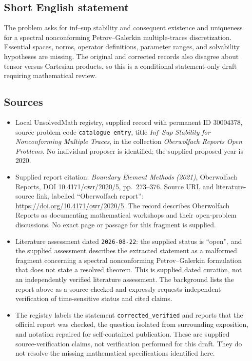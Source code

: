 \documentclass[11pt]{article}
\begin{document}
\subsection{Short English statement}
The problem asks for inf--sup stability and consequent existence and uniqueness for a spectral nonconforming Petrov--Galerkin multiple-traces discretization. Essential spaces, norms, operator definitions, parameter ranges, and solvability hypotheses are missing. The original and corrected records also disagree about tensor versus Cartesian products, so this is a conditional statement-only draft requiring mathematical review.
\subsection{Sources}
\begin{itemize}
\item Local UnsolvedMath registry, supplied record with permanent ID \(30004378\), source problem code \texttt{catalogue entry}, title \emph{Inf--Sup Stability for Nonconforming Multiple Traces}, in the collection \emph{Oberwolfach Reports Open Problems}. No individual proposer is identified; the supplied proposed year is 2020.
\item Supplied report citation: \emph{Boundary Element Methods (2021)}, Oberwolfach Reports, DOI 10.4171/owr/2020/5, pp.~273--376. Source URL and literature-source link, labelled ``Oberwolfach report'': \url{https://doi.org/10.4171/owr/2020/5}. The record describes Oberwolfach Reports as documenting mathematical workshops and their open-problem discussions. No exact page or passage for this fragment is supplied.
\item Literature assessment dated \texttt{2026-08-22}: the supplied status is ``open'', and the supplied assessment describes the extracted statement as a malformed fragment concerning a spectral nonconforming Petrov--Galerkin formulation that does not state a resolved theorem. This is supplied dated curation, not an independently verified literature assessment. The background lists the report above as a source checked and expressly requests independent verification of time-sensitive status and cited claims.
\item The registry labels the statement \texttt{corrected\_verified} and reports that the official report was checked, the question isolated from surrounding exposition, and notation repaired for self-contained publication. These are supplied source-verification claims, not verification performed for this draft. They do not resolve the missing mathematical specifications identified here.
\end{itemize}
\end{document}
